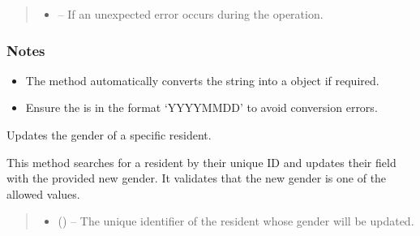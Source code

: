 \documentclass[letterpaper,10pt,english]{sphinxmanual}
\begin{document}
\begin{fulllineitems}
\begin{fulllineitems}
\begin{quote}
\begin{description}
\begin{itemize}
\item {} 
\sphinxAtStartPar
{} – If an unexpected error occurs during the operation.

\end{itemize}

\end{description}\end{quote}
\subsubsection*{Notes}
\begin{itemize}
\item {} 
\sphinxAtStartPar
The method automatically converts the  string into a  object if required.

\item {} 
\sphinxAtStartPar
Ensure the  is in the format ‘YYYY\sphinxhyphen{}MM\sphinxhyphen{}DD’ to avoid conversion errors.

\end{itemize}

\end{fulllineitems}


\begin{fulllineitems}
\label{\detokenize{app.controllers:app.controllers.resident_controller.ResidentController.updateResidentGender}}
\pysigstartsignatures
\pysiglinewithargsret
{}
{\sphinxparamcomma {}\sphinxparamcomma {}}
{}
\pysigstopsignatures
\sphinxAtStartPar
Updates the gender of a specific resident.

\sphinxAtStartPar
This method searches for a resident by their unique ID and updates their  field
with the provided new gender. It validates that the new gender is one of the allowed values.
\begin{quote}\begin{description}
\begin{itemize}
\item {} 
\sphinxAtStartPar
{} () – The unique identifier of the resident whose gender will be updated.


\end{itemize}
\end{description}
\end{quote}
\end{fulllineitems}
\end{fulllineitems}
\end{document}
